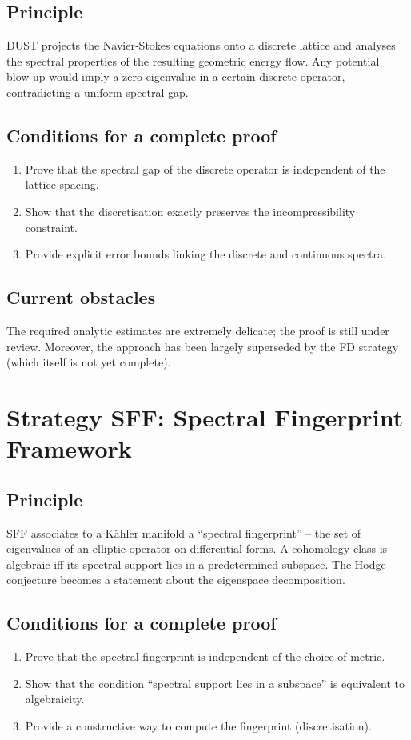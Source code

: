 \documentclass[11pt,a4paper]{article}
\begin{document}
\subsection{Principle}
DUST projects the Navier‑Stokes equations onto a discrete lattice and analyses the spectral properties of the resulting geometric energy flow. Any potential blow‑up would imply a zero eigenvalue in a certain discrete operator, contradicting a uniform spectral gap.

\subsection{Conditions for a complete proof}
\begin{enumerate}
\item Prove that the spectral gap of the discrete operator is independent of the lattice spacing.
\item Show that the discretisation exactly preserves the incompressibility constraint.
\item Provide explicit error bounds linking the discrete and continuous spectra.
\end{enumerate}

\subsection{Current obstacles}
The required analytic estimates are extremely delicate; the proof is still under review. Moreover, the approach has been largely superseded by the FD strategy (which itself is not yet complete).

\section{Strategy SFF: Spectral Fingerprint Framework}

\subsection{Principle}
SFF associates to a Kähler manifold a “spectral fingerprint” – the set of eigenvalues of an elliptic operator on differential forms. A cohomology class is algebraic iff its spectral support lies in a predetermined subspace. The Hodge conjecture becomes a statement about the eigenspace decomposition.

\subsection{Conditions for a complete proof}
\begin{enumerate}
\item Prove that the spectral fingerprint is independent of the choice of metric.
\item Show that the condition “spectral support lies in a subspace” is equivalent to algebraicity.
\item Provide a constructive way to compute the fingerprint (discretisation).
\end{enumerate}
\end{document}
